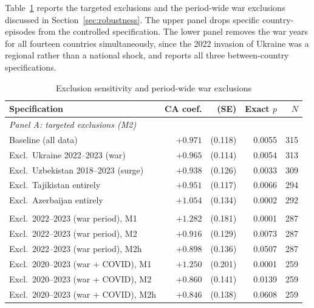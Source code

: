 Table~\ref{tab:exclusions} reports the targeted exclusions and the period-wide war exclusions discussed in Section~\ref{sec:robustness}. The upper panel drops specific country-episodes from the controlled specification. The lower panel removes the war years for all fourteen countries simultaneously, since the 2022 invasion of Ukraine was a regional rather than a national shock, and reports all three between-country specifications.

\begin{table}[htbp]
\centering
\caption{Exclusion sensitivity and period-wide war exclusions}
\label{tab:exclusions}
\small
\begin{tabular}{lrrrr}
\toprule
Specification & CA coef. & (SE) & Exact $p$ & $N$ \\
\midrule
\multicolumn{5}{l}{\emph{Panel A: targeted exclusions (M2)}} \\
Baseline (all data)               & $+0.971$ & (0.118) & 0.0055 & 315 \\
Excl.\ Ukraine 2022--2023 (war)    & $+0.965$ & (0.114) & 0.0054 & 313 \\
Excl.\ Uzbekistan 2018--2023 (surge) & $+0.938$ & (0.126) & 0.0033 & 309 \\
Excl.\ Tajikistan entirely         & $+0.951$ & (0.117) & 0.0066 & 294 \\
Excl.\ Azerbaijan entirely         & $+1.054$ & (0.134) & 0.0002 & 292 \\
\addlinespace
\multicolumn{5}{l}{\emph{Panel B: period-wide exclusions, all countries}} \\
Excl.\ 2022--2023 (war period), M1  & $+1.282$ & (0.181) & 0.0001 & 287 \\
Excl.\ 2022--2023 (war period), M2  & $+0.916$ & (0.129) & 0.0073 & 287 \\
Excl.\ 2022--2023 (war period), M2h & $+0.898$ & (0.136) & 0.0507 & 287 \\
Excl.\ 2020--2023 (war + COVID), M1  & $+1.250$ & (0.201) & 0.0001 & 259 \\
Excl.\ 2020--2023 (war + COVID), M2  & $+0.860$ & (0.141) & 0.0139 & 259 \\
Excl.\ 2020--2023 (war + COVID), M2h & $+0.846$ & (0.138) & 0.0608 & 259 \\
\bottomrule
\end{tabular}


\end{table}
